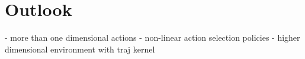 \chapter{Outlook}
\label{chap:7}
%
- more than one dimensional actions
- non-linear action selection policies
- higher dimensional environment with traj kernel
